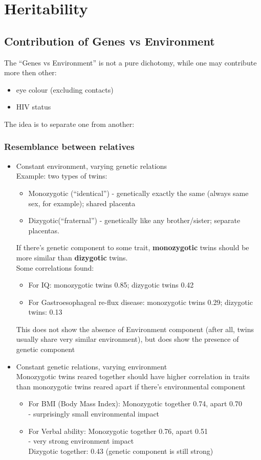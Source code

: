 \documentclass{scrartcl}
\begin{document}
\section{Heritability}
\label{sec:05-0}
\subsection{Contribution of Genes vs Environment}
\label{sec:05-1}
The ``Genes vs Environment'' is not a pure dichotomy, while one may contribute more then other:
\begin{itemize}
\item eye colour (excluding contacts)
\item HIV status
\end{itemize}
The idea is to separate one from another:
\subsubsection{Resemblance between relatives}
\label{sec:5-1-0533}
\begin{itemize}
\item Constant environment, varying genetic relations\\
Example: two types of twins:
\begin{itemize}
\item Monozygotic (``identical'') - genetically exactly the same (always same sex, for example); shared placenta
\item Dizygotic(``fraternal'') - genetically like any brother/sister; separate placentas.
\end{itemize}
If there's genetic component to some trait, {\bf monozygotic} twins should be more similar than {\bf dizygotic} twins.\\
Some correlations found:
\begin{itemize}
\item For IQ: monozygotic twins 0.85; dizygotic twins 0.42
\item For Gastroesophageal re-flux disease: monozygotic twins 0.29; dizygotic twins: 0.13
\end{itemize}
This does not show the absence of Environment component (after all, twins usually share very similar environment), but does show the presence of genetic component
\item Constant genetic relations, varying  environment\\
Monozygotic twins reared together should have higher correlation in traits than monozygotic twins reared apart if there's environmental component
\begin{itemize}
\item For BMI (Body Mass Index): Monozygotic together 0.74, apart 0.70\\ 
- surprisingly small environmental impact
\item For Verbal ability: Monozygotic together 0.76, apart 0.51\\
- very strong environment impact\\ 
Dizygotic together: 0.43 (genetic component is still strong)
\end{itemize}
\end{itemize}
\end{document}

